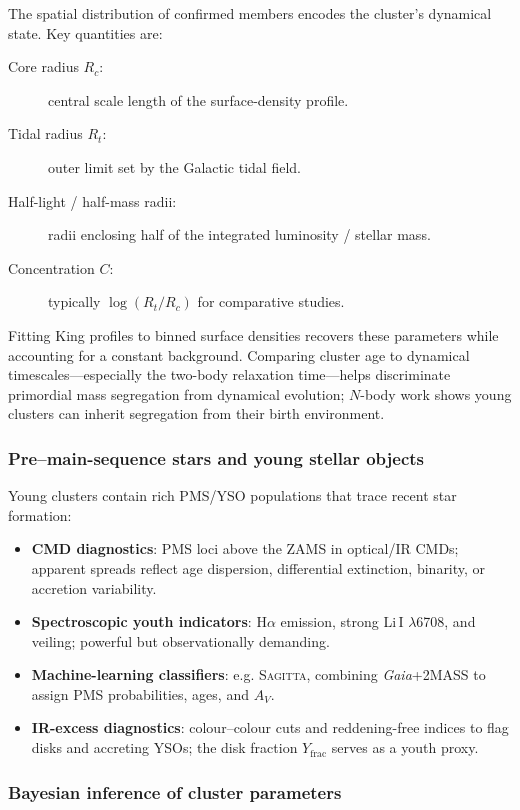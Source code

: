 \documentclass[../main.tex]{subfiles}
\begin{document}
The spatial distribution of confirmed members encodes the cluster’s dynamical state. Key quantities are:
\begin{description}
  \item[Core radius $R_c$:] central scale length of the surface-density profile.
  \item[Tidal radius $R_t$:] outer limit set by the Galactic tidal field.
  \item[Half-light / half-mass radii:] radii enclosing half of the integrated luminosity / stellar mass.
  \item[Concentration $C$:] typically $\log(R_t/R_c)$ for comparative studies.
\end{description}
Fitting King profiles to binned surface densities recovers these parameters while accounting for a constant background. Comparing cluster age to dynamical timescales—especially the two-body relaxation time—helps discriminate primordial mass segregation from dynamical evolution; $N$-body work shows young clusters can inherit segregation from their birth environment.

\subsubsection{Pre–main-sequence stars and young stellar objects}
\label{subsubsec:pms-ysos}

Young clusters contain rich PMS/YSO populations that trace recent star formation:
\begin{itemize}
  \item \textbf{CMD diagnostics}: PMS loci above the ZAMS in optical/IR CMDs; apparent spreads reflect age dispersion, differential extinction, binarity, or accretion variability.
  \item \textbf{Spectroscopic youth indicators}: H$\alpha$ emission, strong Li\,I $\lambda$6708, and veiling; powerful but observationally demanding.
  \item \textbf{Machine-learning classifiers}: e.g. \textsc{Sagitta}, combining \textit{Gaia}+2MASS to assign PMS probabilities, ages, and $A_V$.
  \item \textbf{IR-excess diagnostics}: colour–colour cuts and reddening-free indices to flag disks and accreting YSOs; the disk fraction $Y_{\text{frac}}$ serves as a youth proxy.
\end{itemize}

\subsubsection{Bayesian inference of cluster parameters} 
\label{subsubsec:bayesian-inference}
\end{document}
